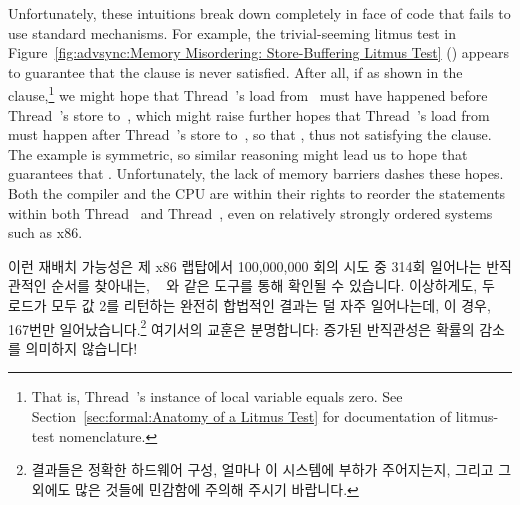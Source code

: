 Unfortunately, these intuitions break down completely in face of
code that fails to use standard mechanisms.
For example, the trivial-seeming litmus test in
Figure~\ref{fig:advsync:Memory Misordering: Store-Buffering Litmus Test}
()
appears to guarantee that the  clause is never satisfied.
After all, if  as shown in the  clause,\footnote{
	That is, Thread~'s instance of local variable 
	equals zero.
	See Section~\ref{sec:formal:Anatomy of a Litmus Test}
	for documentation of litmus-test nomenclature.}
we might hope that Thread~'s
load from~ must have happened before Thread~'s store to~,
which might raise
further hopes that Thread~'s load from~ must happen after
Thread~'s store to~, so that ,
thus not satisfying the  clause.
The example is symmetric, so similar reasoning might lead
us to hope that  guarantees that .
Unfortunately, the lack of memory barriers dashes these hopes.
Both the compiler and the CPU are within their rights to reorder
the statements within both Thread~ and Thread~,
even on relatively strongly ordered systems such as x86.
\fi

이런 재배치 가능성은 제 x86 랩탑에서 100,000,000 회의 시도 중 314회 일어나는
반직관적인 순서를 찾아내는,
~\cite{Alglave:2014:HCM:2594291.2594347} 와 같은 도구를 통해 확인될
수 있습니다.
이상하게도, 두 로드가 모두 값 2를 리턴하는 완전히 합법적인 결과는 덜 자주
일어나는데, 이 경우, 167번만 일어났습니다.\footnote{
	결과들은 정확한 하드웨어 구성, 얼마나 이 시스템에 부하가 주어지는지,
	그리고 그 외에도 많은 것들에 민감함에 주의해 주시기 바랍니다.}
여기서의 교훈은 분명합니다: 증가된 반직관성은 확률의 감소를 의미하지 않습니다!

